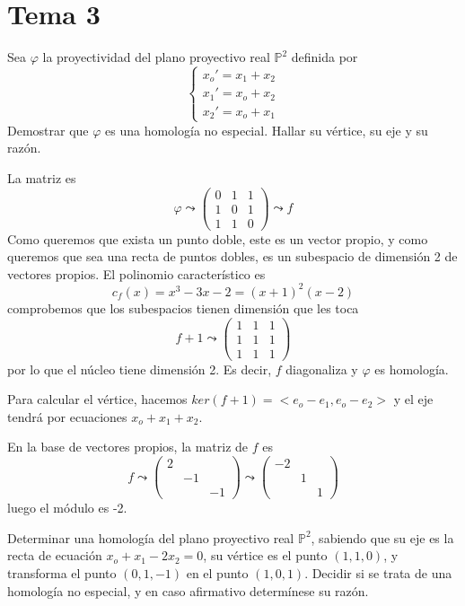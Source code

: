 \section{Tema 3}
\begin{ejer}
    [1] Sea $\varphi$ la proyectividad del plano proyectivo real $\mathbb P^2$ definida por $$\begin{cases}
         x_o' = x_1 + x_2 \\ x_1' = x_o + x_2 \\ x_2' = x_o + x_1 \end{cases}$$
Demostrar que $\varphi$ es una homolog\'ia no especial. Hallar su v\'ertice, su eje y su raz\'on.
\end{ejer}
\begin{sol}
    La matriz es 
    $$\varphi \leadsto \begin{pmatrix}
        0 & 1 & 1 \\ 1 & 0 & 1 \\ 1 & 1 & 0
    \end{pmatrix} \leadsto f$$
    Como queremos que exista un punto doble, este es un vector propio, y como queremos que sea una recta de puntos dobles, es un subespacio de dimensi\'on 2 de vectores propios. El polinomio caracter\'istico es
    $$c_f(x) = x^3 - 3x -2 = (x+1)^2(x-2)$$
    comprobemos que los subespacios tienen dimensi\'on que les toca
    $$f+1\leadsto \begin{pmatrix}
        1 & 1 & 1 \\ 1 & 1 & 1 \\ 1 & 1 & 1 
    \end{pmatrix}$$
    por lo que el n\'ucleo tiene dimensi\'on 2. Es decir, $f$ diagonaliza y $\varphi$ es homolog\'ia.

    Para calcular el v\'ertice, hacemos $ker(f+1) = <e_o-e_1, e_o-e_2>$ y el eje tendr\'a por ecuaciones $x_o+x_1+x_2$. 

    En la base de vectores propios, la matriz de $f$ es 
    $$f \leadsto \begin{pmatrix}
        2 \\ & -1 \\ & & -1
    \end{pmatrix}\leadsto \begin{pmatrix}
        -2 \\ & 1 \\ & & 1
    \end{pmatrix}$$
    luego el m\'odulo es -2.
\end{sol}
\begin{ejer}
    [2] Determinar una homolog\'ia del plano proyectivo real $\mathbb P^2$, sabiendo que su eje es la recta de
    ecuaci\'on $x_o + x_1 - 2x_2 = 0$, su v\'ertice es el punto $(1, 1, 0)$, y transforma el punto $(0, 1, -1)$
    en el punto $(1, 0, 1)$. Decidir si se trata de una homolog\'ia no especial, y en caso afirmativo determ\'inese su raz\'on.
\end{ejer}
